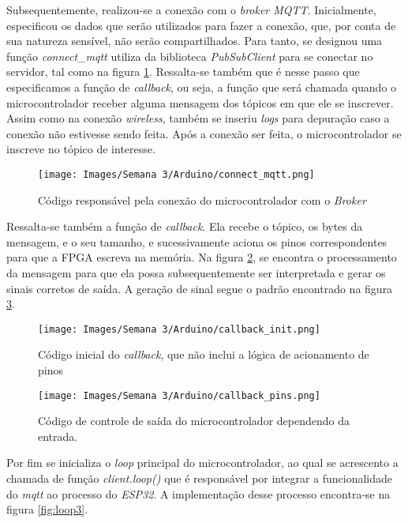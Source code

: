 \documentclass[amsmath,amssymb,floatfix]{report}
\begin{document}
Subsequentemente, realizou-se a conexão com o \textit{broker MQTT}. Inicialmente, especificou os dados que serão utilizados para fazer a conexão, que, por conta de sua natureza sensível, não serão compartilhados. Para tanto, se designou uma função \textit{connect\_mqtt} utiliza da biblioteca \textit{PubSubClient} para se conectar no servidor, tal como na figura \ref{fig:connect_mqtt3}. Ressalta-se também que é nesse passo que especificamos a função de \textit{callback}, ou seja, a função que será chamada quando o microcontrolador receber alguma mensagem dos tópicos em que ele se inscrever. Assim como na conexão \textit{wireless}, também se inseriu \textit{logs} para depuração caso a conexão não estivesse sendo feita. Após a conexão ser feita, o microcontrolador se inscreve no tópico de interesse. 

\begin{figure}[H]
\centering
\texttt{[image: Images/Semana 3/Arduino/connect\_mqtt.png]} 
    \caption{Código responsável pela conexão do microcontrolador com o \textit{Broker}}
    \label{fig:connect_mqtt3}
\end{figure}

Ressalta-se também a função de \textit{callback}. Ela recebe o tópico, os bytes da mensagem, e o seu tamanho, e sucessivamente aciona os pinos correspondentes para que a FPGA escreva na memória. Na figura \ref{fig:callbackInit3}, se encontra o processamento da mensagem para que ela possa subsequentemente ser interpretada e gerar os sinais corretos de saída. A geração de sinal segue o padrão encontrado na figura \ref{fig:callbackPins3}. 


\begin{figure}[H]
\centering
\texttt{[image: Images/Semana 3/Arduino/callback\_init.png]} 
    \caption{Código inicial do \textit{callback}, que não inclui a lógica de acionamento de pinos}
    \label{fig:callbackInit3}
\end{figure}

\begin{figure}[H]
\centering
\texttt{[image: Images/Semana 3/Arduino/callback\_pins.png]} 
    \caption{Código de controle de saída do microcontrolador dependendo da entrada.}
    \label{fig:callbackPins3}
\end{figure}

Por fim se inicializa o \textit{loop} principal do microcontrolador, ao qual se acrescento a chamada de função \textit{client.loop()} que é responsável por integrar a funcionalidade do \textit{mqtt} ao processo do \textit{ESP32}. A implementação desse processo encontra-se na figura \ref{fig:loop3}.
\end{document}
